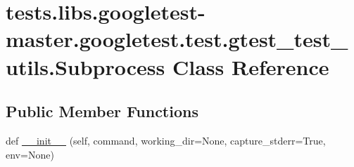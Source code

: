 \hypertarget{classtests_1_1libs_1_1googletest-master_1_1googletest_1_1test_1_1gtest__test__utils_1_1Subprocess}{}\section{tests.\+libs.\+googletest-\/master.googletest.\+test.\+gtest\+\_\+test\+\_\+utils.\+Subprocess Class Reference}
\label{classtests_1_1libs_1_1googletest-master_1_1googletest_1_1test_1_1gtest__test__utils_1_1Subprocess}
\subsection*{Public Member Functions}
\begin{DoxyCompactItemize}
\item 
def \hyperlink{classtests_1_1libs_1_1googletest-master_1_1googletest_1_1test_1_1gtest__test__utils_1_1Subprocess_ac913db50cc2668a5b36a4e7036b6e846}{\+\_\+\+\_\+init\+\_\+\+\_\+} (self, command, working\+\_\+dir=None, capture\+\_\+stderr=True, env=None)
\end{DoxyCompactItemize}
